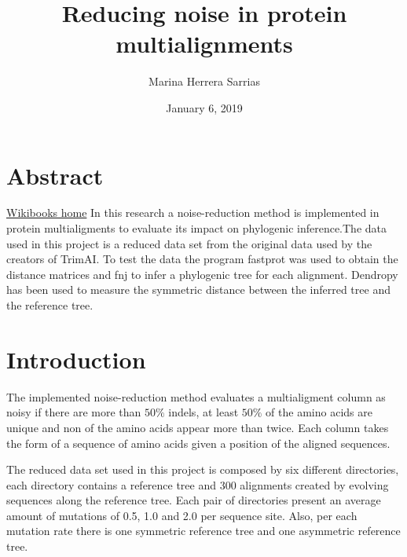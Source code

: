 \documentclass[12pt]{article}
\begin{document}
\begin{titlepage}
\title{\vspace{60mm}Reducing noise in protein multialignments}
\author{Marina Herrera Sarrias}
\date{January 6, 2019}

\clearpage\maketitle
\thispagestyle{empty}
\end{titlepage}

\section*{Abstract}

\href{www.wikibooks.org}{Wikibooks home}
In this research a noise-reduction method is implemented in protein multialigments to evaluate its impact on phylogenic inference.The data used in this project is a reduced data set from the  original data used by the creators of TrimAI. To test the data the program fastprot was used to obtain the distance matrices and fnj to infer a phylogenic tree for each alignment. Dendropy has been used to measure the symmetric distance between the inferred tree and the reference tree. %

\clearpage
	
\tableofcontents
\clearpage

\section{Introduction}

The implemented noise-reduction method evaluates a multialigment column as noisy if there are more than $50\%$ indels, at least $50\%$ of the amino acids are unique and non of the amino acids appear more than twice. Each column takes the form of a sequence of amino acids given a position of the aligned sequences.

The reduced data set used in this project is composed by six different directories, each directory contains a reference tree and 300 alignments created by evolving sequences along the reference tree. Each pair of directories present an average amount of mutations of 0.5, 1.0 and 2.0 per sequence site. Also, per each mutation rate there is one symmetric reference tree and one asymmetric reference tree.
\end{document}
